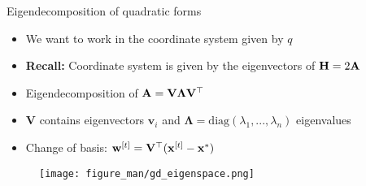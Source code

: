 \documentclass[11pt,compress,t,notes=noshow, xcolor=table]{beamer}
\begin{document}
\begin{vbframe}{Eigendecomposition of quadratic forms}

\begin{itemize}
    \setlength{\itemsep}{0.5em}
    \item We want to work in the coordinate system given by $q$
    \item \textbf{Recall:} Coordinate system is given by the eigenvectors of $\mathbf{H} = 2\mathbf{A}$
    \item Eigendecomposition of $\mathbf{A} = \mathbf{V} \bm{\Lambda} \mathbf{V}^\top$
    \item $\mathbf{V}$ contains eigenvectors $\mathbf{v}_i$ and $\bm{\Lambda} = \text{diag}(\lambda_1, ..., \lambda_n)$ eigenvalues
    \item Change of basis: $\mathbf{w}^{[t]} = \mathbf{V}^\top (\mathbf{x}^{[t]} - \mathbf{x}^\ast)$
\end{itemize}

\begin{figure}
	\texttt{[image: figure\_man/gd\_eigenspace.png]} \\
\end{figure}

\end{vbframe}
\end{document}
